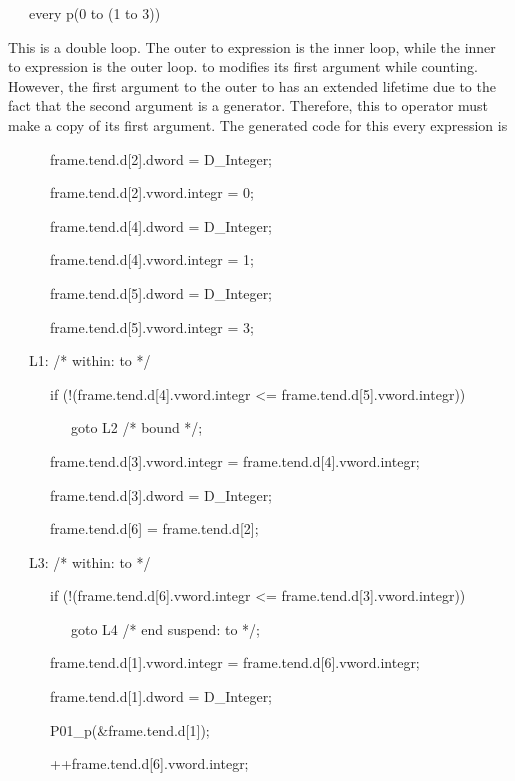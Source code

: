 {\ttfamily\mdseries
\ \ \ every p(0 to (1 to 3))}


This is a double loop. The outer to expression is the inner loop,
while the inner to expression is the outer loop. to modifies its first
argument while counting. However, the first argument to the outer to
has an extended lifetime due to the fact that the second argument is a
generator. Therefore, this to operator must make a copy of its first
argument.  The generated code for this every expression is

{\ttfamily\mdseries
\ \ \ \ \ \ frame.tend.d[2].dword = D\_Integer;}

{\ttfamily\mdseries
\ \ \ \ \ \ frame.tend.d[2].vword.integr = 0;}

{\ttfamily\mdseries
\ \ \ \ \ \ frame.tend.d[4].dword = D\_Integer;}

{\ttfamily\mdseries
\ \ \ \ \ \ frame.tend.d[4].vword.integr = 1;}

{\ttfamily\mdseries
\ \ \ \ \ \ frame.tend.d[5].dword = D\_Integer;}

{\ttfamily\mdseries
\ \ \ \ \ \ frame.tend.d[5].vword.integr = 3;}

{\ttfamily\mdseries
\ \ \ L1: /* within: to */}

{\ttfamily\mdseries
\ \ \ \ \ \ if (!(frame.tend.d[4].vword.integr {\textless}= frame.tend.d[5].vword.integr))}

{\ttfamily\mdseries
\ \ \ \ \ \ \ \ \ goto L2 /* bound */;}

{\ttfamily\mdseries
\ \ \ \ \ \ frame.tend.d[3].vword.integr = frame.tend.d[4].vword.integr;}

{\ttfamily\mdseries
\ \ \ \ \ \ frame.tend.d[3].dword = D\_Integer;}

{\ttfamily\mdseries
\ \ \ \ \ \ frame.tend.d[6] = frame.tend.d[2];}

{\ttfamily\mdseries
\ \ \ L3: /* within: to */}

{\ttfamily\mdseries
\ \ \ \ \ \ if (!(frame.tend.d[6].vword.integr {\textless}= frame.tend.d[3].vword.integr))}

{\ttfamily\mdseries
\ \ \ \ \ \ \ \ \ goto L4 /* end suspend: to */;}

{\ttfamily\mdseries
\ \ \ \ \ \ frame.tend.d[1].vword.integr = frame.tend.d[6].vword.integr;}

{\ttfamily\mdseries
\ \ \ \ \ \ frame.tend.d[1].dword = D\_Integer;}

{\ttfamily\mdseries
\ \ \ \ \ \ P01\_p(\&frame.tend.d[1]);}

{\ttfamily\mdseries
\ \ \ \ \ \ ++frame.tend.d[6].vword.integr;}

